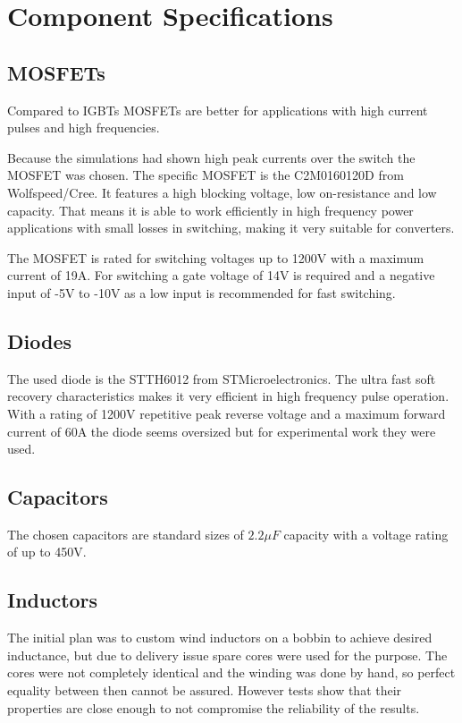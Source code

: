 \section{Component Specifications}\label{ch:compSpec}

\subsection{MOSFETs}
Compared to IGBTs MOSFETs are better for applications with high current pulses and high frequencies.\cite{igbtelec63:online}

Because the simulations had shown high peak currents over the switch the MOSFET was chosen.
The specific MOSFET is the C2M0160120D from Wolfspeed/Cree. 
It features a high blocking voltage, low on-resistance and low capacity.
That means it is able to work efficiently in high frequency power applications with small losses in switching, making it very suitable for converters.

The MOSFET is rated for switching voltages up to 1200V with a maximum current of 19A.
For switching a gate voltage of 14V is required and a negative input of -5V to -10V as a low input is recommended for fast switching.\cite{CreeC2M082:online}

\subsection{Diodes}
The used diode is the STTH6012 from STMicroelectronics.
The ultra fast soft recovery characteristics makes it very efficient in high frequency pulse operation.
With a rating of 1200V repetitive peak reverse voltage and a maximum forward current of 60A the diode seems oversized but for experimental work they were used.\cite{ST}
\subsection{Capacitors}
The chosen capacitors are standard sizes of $2.2 \mu F$ capacity with a voltage rating of up to 450V.

\subsection{Inductors}
The initial plan was to custom wind inductors on a bobbin to achieve desired inductance, but due to delivery issue spare cores were used for the purpose. The cores were not completely identical and the winding was done by hand, so perfect equality between then cannot be assured. However tests show that their properties are close enough to not compromise the reliability of the results. 
